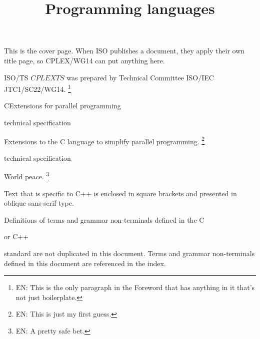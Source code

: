\documentclass[
	techspec,	%
	final,		%
	notcopyright,	%
	letterpaper	%
	]{isov2}
\newcommand{\cplexts}{$CPLEXTS$}
\begin{document}
\begin{cover}
This is the cover page.
When ISO publishes a document, they apply their own title page,
so CPLEX/WG14 can put anything here.
\clearpage
\end{cover}


\begin{foreword}


ISO/TS
\cplexts{}
was prepared by Technical Committee ISO/IEC JTC1/SC22/WG14.%
\footnote{EN:
This is the only paragraph in the Foreword that has anything in it
that's not just boilerplate.
}

\fwdnopatents
\end{foreword}

\begin{introduction}
\intropatents
\end{introduction}

\title{Programming languages}{C}{Extensions for parallel programming}

\scopeclause
\begin{inscope}{technical specification}
\item
Extensions to the C language to simplify parallel programming.%
\footnote{EN:
This is just my first guess.
}
\end{inscope}
\begin{outofscope}{technical specification}
\item
World peace.%
\footnote{EN:
A pretty safe bet.
}
\end{outofscope}

\normrefsclause
{}
\begin{nreferences}
\end{nreferences}




\pnum
\begin{cpp}
Text that is specific to C++
is enclosed in square brackets
and presented in oblique sans-serif type.
\end{cpp}

\pnum
Definitions of terms and grammar non-terminals defined in the C
\begin{cpp}
or C++
\end{cpp}
standard are not duplicated in this document.
Terms and grammar non-terminals defined in this document
are referenced in the index.
\end{document}
